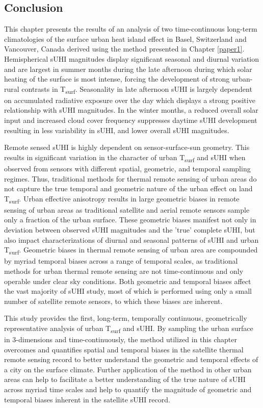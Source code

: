 \begin{bibunit}
\section{Conclusion}

This chapter presents the results of an analysis of two time-continuous long-term climatologies of the surface urban heat island effect in Basel, Switzerland and Vancouver, Canada derived using the method presented in Chapter \ref{paper1}. Hemispherical sUHI magnitudes display significant seasonal and diurnal variation and are largest in summer months during the late afternoon during which solar heating of the surface is most intense, forcing the development of strong urban-rural contrasts in T\textsubscript{surf}. Seasonality in late afternoon sUHI is largely dependent on accumulated radiative exposure over the day which displays a strong positive relationship with sUHI magnitudes. In the winter months, a reduced overall solar input and increased cloud cover frequency suppresses daytime sUHI development resulting in less variability in sUHI, and lower overall sUHI magnitudes. 

Remote sensed sUHI is highly dependent on sensor-surface-sun geometry. This results in significant variation in the character of urban T\textsubscript{surf} and sUHI when observed from sensors with different spatial, geometric, and temporal sampling regimes. Thus, traditional methods for thermal remote sensing of urban areas do not capture the true temporal and geometric nature of the urban effect on land T\textsubscript{surf}. Urban effective anisotropy results in large geometric biases in remote sensing of urban areas as traditional satellite and aerial remote sensors sample only a fraction of the urban surface. These geometric biases manifest not only in deviation between observed sUHI magnitudes and the 'true' complete sUHI, but also impact characterizations of diurnal and seasonal patterns of sUHI and urban T\textsubscript{surf}. Geometric biases in thermal remote sensing of urban area are compounded by myriad temporal biases across a range of temporal scales, as traditional methods for urban thermal remote sensing are not time-continuous and only operable under clear sky conditions. Both geometric and temporal biases affect the vast majority of sUHI study, most of which is performed using only a small number of satellite remote sensors, to which these biases are inherent.

This study provides the first, long-term, temporally continuous, geometrically representative analysis of urban T\textsubscript{surf} and sUHI. By sampling the urban surface in 3-dimensions and time-continuously, the method utilized in this chapter overcomes and quantifies spatial and temporal biases in the satellite thermal remote sensing record to better understand the geometric and temporal effects of a city on the surface climate. Further application of the method in other urban areas can help to facilitate a better understanding of the true nature of sUHI across myriad time scales and help to quantify the magnitude of geometric and temporal biases inherent in the satellite sUHI record.

\cleardoublepage 
{}  
\renewcommand*{\bibname}{References}


\putbib
\end{bibunit}